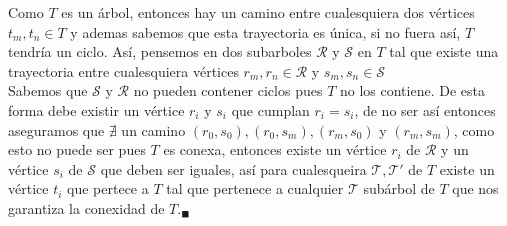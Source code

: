 \documentclass[12pt]{article}
\begin{document}
Como $T$ es un árbol, entonces hay un camino entre cualesquiera dos vértices $t_m,t_n \in T$ y ademas sabemos que esta trayectoria es única, si
no fuera así, $T$ tendría un ciclo. Así, pensemos en dos subarboles $\mathcal{R}$ y $\mathcal{S}$ en $T$ tal que existe una trayectoria
entre cualesquiera vértices $r_m,r_n \in \mathcal{R}$ y $s_m,s_n \in \mathcal{S}$\\

Sabemos que $\mathcal{S}$ y $\mathcal{R}$ no pueden contener ciclos pues $T$ no los contiene. De esta forma debe existir un vértice 
$r_i$ y $s_i$ que cumplan $r_i = s_i$, de no ser así entonces aseguramos que $\nexists$ un camino $(r_0,s_0), (r_0,s_m), (r_m,s_0)$ y $(r_m,s_m)$, como esto no puede ser
pues $T$ es conexa, entonces existe un vértice $r_i$ de $\mathcal{R}$ y un vértice $s_i$ de $\mathcal{S}$ que deben ser iguales, así para cualesqueira $\mathcal{T}, \mathcal{T}'$ de $T$
existe un vértice $t_i$ que pertece a $T$ tal que pertenece a cualquier $\mathcal{T}$ subárbol de $T$ que nos garantiza la conexidad de $T$.$_{\blacksquare}$
\end{document}
